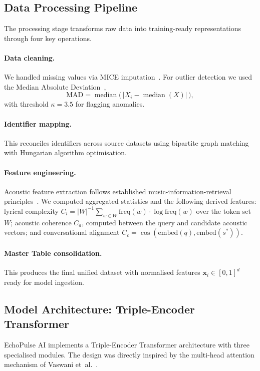 \documentclass[]{ceurart}
\newcommand{\vect}[1]{\boldsymbol{#1}}
\newcommand{\cosine}{\operatorname{cos}}
\begin{document}
\subsection{Data Processing Pipeline}
The processing stage transforms raw data into training-ready representations
through four key operations.

\paragraph{Data cleaning.}
We handled missing values via MICE imputation~\cite{vanbuuren2011mice}. For
outlier detection we used the Median Absolute Deviation~\cite{leys2013mad},
\begin{equation}
\text{MAD} = \operatorname{median}\bigl(\,|X_i - \operatorname{median}(X)|\,\bigr),
\label{eq:mad}
\end{equation}
with threshold $\kappa = 3.5$ for flagging anomalies.

\paragraph{Identifier mapping.}
This reconciles identifiers across source datasets using bipartite graph
matching with Hungarian algorithm optimisation.

\paragraph{Feature engineering.}
Acoustic feature extraction follows established music-information-retrieval
principles~\cite{mueller2015fundamentals}. We computed aggregated statistics and
the following derived features: lyrical complexity
$C_l = |W|^{-1} \sum_{w \in W} \mathrm{freq}(w)\cdot \log \mathrm{freq}(w)$
over the token set $W$; acoustic coherence $C_a$, computed between the query
and candidate acoustic vectors; and conversational alignment
$C_c = \cosine(\mathrm{embed}(q), \mathrm{embed}(s^{*}))$.

\paragraph{Master Table consolidation.}
This produces the final unified dataset with normalised features
$\vect{x}_i \in [0,1]^d$ ready for model ingestion.

\subsection{Model Architecture: Triple-Encoder Transformer}
EchoPulse AI implements a Triple-Encoder Transformer architecture with three
specialised modules. The design was directly inspired by the multi-head
attention mechanism of Vaswani et~al.~\cite{vaswani2017attention}.
\end{document}
